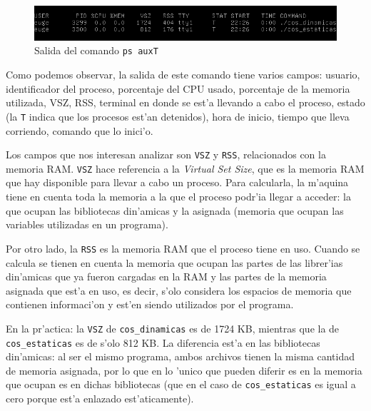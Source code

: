 \documentclass[11pt]{article}
\begin{document}
		\begin{figure}[H]
    			\centering
    			\includegraphics[scale=0.65]{Images/Seccion 1/ps_.png}
    			\caption{Salida del comando \texttt{ps auxT}}
    			\label{fig:ps}
		\end{figure}

		Como podemos observar, la salida de este comando tiene varios campos: usuario, identificador del proceso, porcentaje del CPU usado, porcentaje de la memoria utilizada, VSZ, RSS, terminal en donde se est'a llevando a cabo el proceso, estado (la \texttt{T} indica que los procesos est'an detenidos), hora de inicio, tiempo que lleva corriendo, comando que lo inici'o.

		Los campos que nos interesan analizar son \texttt{VSZ} y \texttt{RSS}, relacionados con la memoria RAM. \texttt{VSZ} hace referencia a la \textit{Virtual Set Size}, que es la memoria RAM que hay disponible para llevar a cabo un proceso. Para calcularla, la m'aquina tiene en cuenta toda la memoria a la que el proceso podr'ia llegar a acceder: la que ocupan las bibliotecas din'amicas y la asignada (memoria que ocupan las variables utilizadas en un programa). \\ %

		\centerline{} \vspace{2pt}

		Por otro lado, la \texttt{RSS} es la memoria RAM que el proceso tiene en uso. Cuando se calcula se tienen en cuenta la memoria que ocupan las partes de las librer'ias din'amicas que ya fueron cargadas en la RAM y las partes de la memoria asignada que est'a en uso, es decir, s'olo considera los espacios de memoria que contienen informaci'on y est'en siendo utilizados por el programa. \\ %

		\centerline{} \vspace{2pt}

		En la pr'actica: la \texttt{VSZ} de \texttt{cos\_dinamicas} es de 1724 KB, mientras que la de \texttt{cos\_estaticas} es de s'olo 812 KB.
		La diferencia est'a en las bibliotecas din'amicas: al ser el mismo programa, ambos archivos tienen la misma cantidad de memoria asignada, por lo que en lo 'unico que pueden diferir es en la memoria que ocupan es en dichas bibliotecas (que en el caso de \texttt{cos\_estaticas} es igual a cero porque est'a enlazado est'aticamente).  
\end{document}
